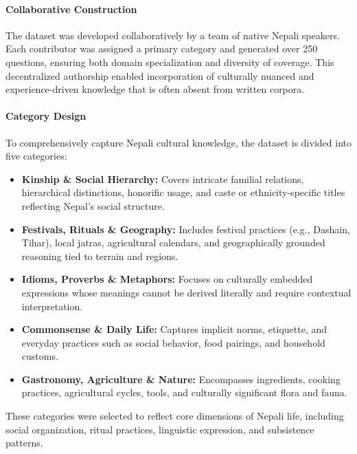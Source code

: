 \documentclass[10pt, a4paper]{article}
\begin{document}
\paragraph{Collaborative Construction}
The dataset was developed collaboratively by a team of native Nepali speakers. Each contributor was assigned a primary category and generated over 250 questions, ensuring both domain specialization and diversity of coverage. This decentralized authorship enabled incorporation of culturally nuanced and experience-driven knowledge that is often absent from written corpora.

\paragraph{Category Design}
To comprehensively capture Nepali cultural knowledge, the dataset is divided into five categories:

\begin{itemize}
    \item \textbf{Kinship \& Social Hierarchy:} Covers intricate familial relations, hierarchical distinctions, honorific usage, and caste or ethnicity-specific titles reflecting Nepal’s social structure.
    
    \item \textbf{Festivals, Rituals \& Geography:} Includes festival practices (e.g., Dashain, Tihar), local jatras, agricultural calendars, and geographically grounded reasoning tied to terrain and regions.
    
    \item \textbf{Idioms, Proverbs \& Metaphors:} Focuses on culturally embedded expressions whose meanings cannot be derived literally and require contextual interpretation.
    
    \item \textbf{Commonsense \& Daily Life:} Captures implicit norms, etiquette, and everyday practices such as social behavior, food pairings, and household customs.
    
    \item \textbf{Gastronomy, Agriculture \& Nature:} Encompasses ingredients, cooking practices, agricultural cycles, tools, and culturally significant flora and fauna.
\end{itemize}

These categories were selected to reflect core dimensions of Nepali life, including social organization, ritual practices, linguistic expression, and subsistence patterns.
\end{document}
